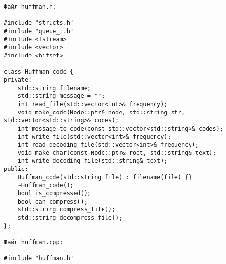 \begin{verbatim}
Файл huffman.h:

#include "structs.h"
#include "queue_t.h"
#include <fstream>
#include <vector>
#include <bitset>

class Huffman_code {
private:
    std::string filename;
    std::string message = "";
    int read_file(std::vector<int>& frequency);
    void make_code(Node::ptr& node, std::string str, std::vector<std::string>& codes);
    int message_to_code(const std::vector<std::string>& codes);
    int write_file(std::vector<int>& frequency);
    int read_decoding_file(std::vector<int>& frequency);
    void make_char(const Node::ptr& root, std::string& text);
    int write_decoding_file(std::string& text);
public:
    Huffman_code(std::string file) : filename(file) {}
    ~Huffman_code();
    bool is_compressed();
    bool can_compress();
    std::string compress_file();
    std::string decompress_file();
};

Файл huffman.cpp:

#include "huffman.h"


\end{verbatim}
